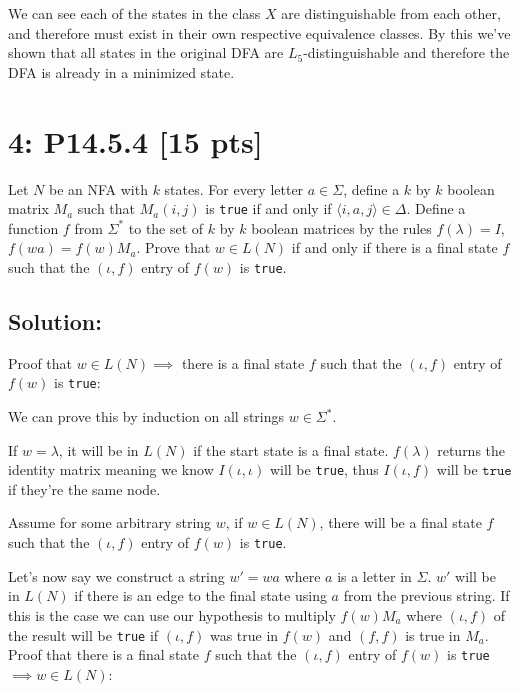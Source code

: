 \documentclass[12pt]{article}
\begin{document}
We can see each of the states in the class $X$ are distinguishable from each other, and therefore must exist in their own respective equivalence classes. By this we've shown that all states in the original DFA are $L_5$-distinguishable and therefore the DFA is already in a minimized state.

\newpage
\section*{\textbf{4: P14.5.4} [15 pts]}
Let $N$ be an NFA with $k$ states. For every letter $a \in \Sigma$, define a $k$ by $k$ boolean matrix $M_a$ such that $M_a(i, j)$ is \texttt{true} if and only if $\langle i, a, j \rangle \in \Delta$. Define a function $f$ from $\Sigma^*$ to the set of $k$ by $k$ boolean matrices by the rules $f(\lambda) = I$, $f(wa) = f(w)M_a$. Prove that $w \in L(N)$ if and only if there is a final state $f$ such that the $(\iota, f)$ entry of $f(w)$ is \texttt{true}.



\subsection*{\textbf{Solution:}}
Proof that $w \in L(N) \implies $ there is a final state $f$ such that the $(\iota, f)$ entry of $f(w)$ is \texttt{true}:

We can prove this by induction on all strings $w \in \Sigma ^*$.

If $w = \lambda$, it will be in $L(N)$ if the start state is a final state. $f(\lambda)$ returns the identity matrix meaning we know $I(\iota, \iota)$ will be \texttt{true}, thus $I(\iota, f)$ will be $\texttt{true}$ if they're the same node.

Assume for some arbitrary string $w$, if $w \in L(N)$, there will be a final state $f$ such that the $(\iota, f)$ entry of $f(w)$ is \texttt{true}.

Let's now say we construct a string $w' = wa$ where $a$ is a letter in $\Sigma$. $w'$ will be in $L(N)$ if there is an edge to the final state using $a$ from the previous string. If this is the case we can use our hypothesis to multiply $f(w)M_a$ where $(\iota, f)$ of the result will be \texttt{true} if $(\iota, f)$ was true in $f(w)$ and $(f,f)$ is true in $M_a$. \\

\noindent
Proof that there is a final state $f$ such that the $(\iota, f)$ entry of $f(w)$ is \texttt{true} $\implies w \in L(N)$:
\end{document}
